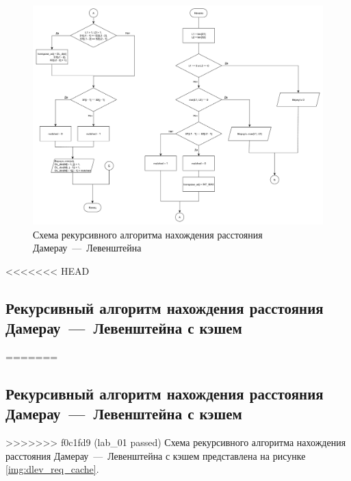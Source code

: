 \begin{figure}[h]
	\centering
	\includegraphics[scale=0.35]{images/dlev_req.pdf}
	\caption{Схема рекурсивного алгоритма нахождения расстояния Дамерау~---~Левенштейна}
	\label{img:dlev_req}
\end{figure}

<<<<<<< HEAD
\newpage

\subsection{Рекурсивный алгоритм нахождения расстояния Дамерау~---~Левенштейна с кэшем}

=======
\subsection{Рекурсивный алгоритм нахождения расстояния Дамерау~---~Левенштейна с кэшем}

>>>>>>> f0c1fd9 (lab_01 passed)
Схема рекурсивного алгоритма нахождения расстояния Дамерау~---~Левенштейна с кэшем представлена на рисунке \ref{img:dlev_req_cache}.


